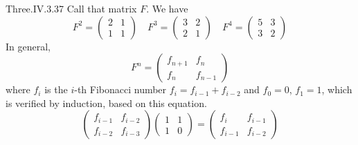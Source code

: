 \begin{ans}{Three.IV.3.37}
      Call that matrix \( F \).
      We have
      \begin{equation*}
        F^2=\begin{pmatrix}
          2  &1  \\
          1  &1
        \end{pmatrix}
        \quad
        F^3=\begin{pmatrix}
          3  &2  \\
          2  &1
        \end{pmatrix}
        \quad
        F^4=\begin{pmatrix}
          5  &3  \\
          3  &2
        \end{pmatrix}
      \end{equation*}
      In general,
      \begin{equation*}
        F^n=\begin{pmatrix}
          f_{n+1} &f_n  \\
          f_n     &f_{n-1}
        \end{pmatrix}
      \end{equation*}
      where \( f_i \) is the \( i \)-th Fibonacci number
      \( f_i=f_{i-1}+f_{i-2} \) and \( f_0=0 \), \( f_1=1 \),
      which is verified by induction, based on this equation.
      \begin{equation*}
        \begin{pmatrix}
          f_{i-1}  &f_{i-2} \\
          f_{i-2}  &f_{i-3}
        \end{pmatrix}
        \begin{pmatrix}
          1  &1  \\
          1  &0
        \end{pmatrix}
        =\begin{pmatrix}
           f_i     &f_{i-1}  \\
           f_{i-1} &f_{i-2}
        \end{pmatrix}
      \end{equation*}
    
\end{ans}
